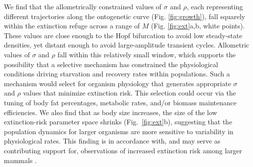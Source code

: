 \documentclass[twocolumn,preprintnumbers,amsmath,amssymb,superscriptaddress]{revtex4}
\begin{document}
We find that the allometrically constrained values of $\sigma$ and $\rho$,
each representing different trajectories along the ontogenetic curve
(Fig. \ref{fig:growth}), fall squarely within the extinction refuge across a
range of $M$ (Fig. \ref{fig:ext}a,b, white points). These values are close
enough to the Hopf bifurcation to avoid low steady-state densities, yet
distant enough to avoid large-amplitude transient cycles.  Allometric values
of $\sigma$ and $\rho$ fall within this relatively small window, which
supports the possibility that a selective mechanism has constrained the
physiological conditions driving starvation and recovery rates within
populations.  Such a mechanism would select for organism physiology that
generates appropriate $\sigma$ and $\rho$ values that minimize extinction
risk.  This selection could occur via the tuning of body fat percentages,
metabolic rates, and/or biomass maintenance efficiencies.  We also find that
as body size increases, the size of the low extinction-risk parameter space
shrinks (Fig.~\ref{fig:ext}b), suggesting that the population dynamics for
larger organisms are more sensitive to variability in physiological rates.
This finding is in accordance with, and may serve as contributing support for, observations of increased extinction risk among larger mammals \cite{Liow:2008jx}.\\





\end{document}
